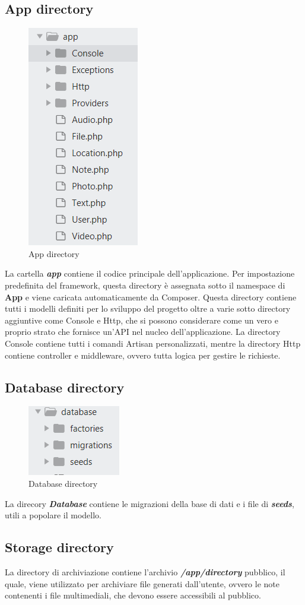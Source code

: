 \subsection{App directory}
\begin{figure}[H]
	\centering
	\includegraphics[width=0.15\linewidth, height=0.2\textheight]{AppDirectory}
	\caption{App directory}
	\label{fig:appdirectory}
\end{figure}
La cartella \textit{\textbf{app}} contiene il codice principale dell'applicazione. Per impostazione predefinita del framework, questa directory è assegnata sotto il namespace di \textbf{App} e viene caricata automaticamente da Composer.
Questa directory contiene tutti i modelli definiti per lo sviluppo del progetto oltre a varie sotto directory aggiuntive come Console e Http, che si possono considerare come un vero e proprio strato che fornisce un'API nel nucleo dell'applicazione.
La directory Console contiene tutti i comandi Artisan personalizzati, mentre la directory Http contiene controller e middleware, ovvero tutta logica per gestire le richieste.

\subsection{Database directory}
\begin{figure}[H]
	\centering
	\includegraphics[width=0.2\linewidth, height=0.1\textheight]{DatabaseDirectory}
	\caption{Database directory}
	\label{fig:databasedirectory}
\end{figure}

La direcory \textit{\textbf{Database}} contiene le migrazioni della base di dati e i file di \textit{\textbf{seeds}}, utili a popolare il modello.

\subsection{Storage directory}
La directory di archiviazione contiene l'archivio \textit{\textbf{/app/directory}} pubblico, il quale, viene utilizzato per archiviare file generati dall'utente, ovvero le note contenenti i file multimediali, che devono essere accessibili al pubblico. 

